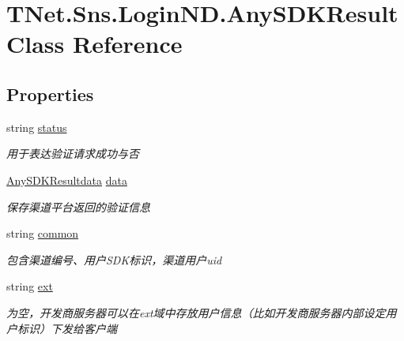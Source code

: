 \hypertarget{class_t_net_1_1_sns_1_1_login_n_d_1_1_any_s_d_k_result}{}\section{T\+Net.\+Sns.\+Login\+N\+D.\+Any\+S\+D\+K\+Result Class Reference}
\label{class_t_net_1_1_sns_1_1_login_n_d_1_1_any_s_d_k_result}


 


\subsection*{Properties}
\begin{DoxyCompactItemize}
\item 
string \mbox{\hyperlink{class_t_net_1_1_sns_1_1_login_n_d_1_1_any_s_d_k_result_a9e3130924f78b113f39c5ffc08c95e37}{status}}
\begin{DoxyCompactList}\small\item\em 用于表达验证请求成功与否 \end{DoxyCompactList}\item 
\mbox{\hyperlink{class_t_net_1_1_sns_1_1_login_n_d_1_1_any_s_d_k_resultdata}{Any\+S\+D\+K\+Resultdata}} \mbox{\hyperlink{class_t_net_1_1_sns_1_1_login_n_d_1_1_any_s_d_k_result_aed829e75148e68c1ab5842b3514ebd81}{data}}
\begin{DoxyCompactList}\small\item\em 保存渠道平台返回的验证信息 \end{DoxyCompactList}\item 
string \mbox{\hyperlink{class_t_net_1_1_sns_1_1_login_n_d_1_1_any_s_d_k_result_ac90e97918970c7266926d6fa2b679cd3}{common}}
\begin{DoxyCompactList}\small\item\em 包含渠道编号、用户\+S\+D\+K标识，渠道用户uid \end{DoxyCompactList}\item 
string \mbox{\hyperlink{class_t_net_1_1_sns_1_1_login_n_d_1_1_any_s_d_k_result_a133b2b6bd70af83a1656ffd2a4331613}{ext}}
\begin{DoxyCompactList}\small\item\em 为空，开发商服务器可以在ext域中存放用户信息（比如开发商服务器内部设定用户标识）下发给客户端 \end{DoxyCompactList}\end{DoxyCompactItemize}



